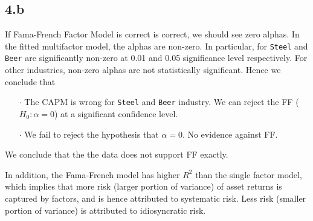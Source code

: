 \documentclass[10 pt]{hwtemplate} %
\begin{document}
\subsection*{4.b} If Fama-French Factor Model is correct is correct, we should see zero alphas. 
In the fitted multifactor model, the alphas are non-zero. In particular, for \texttt{Steel} and \texttt{Beer} are significantly non-zero at 0.01 and 0.05 significance level respectively. For other industries, non-zero alphas are not statistically significant. Hence we conclude that
\begin{itemize}
  \item[$\cdot$] The CAPM is wrong for \texttt{Steel} and \texttt{Beer} industry. We can reject the FF ($H_0: \alpha = 0$) at a significant confidence level.
  \item[$\cdot$] We fail to reject the hypothesis that $\alpha = 0$. No evidence against FF.
\end{itemize}
We conclude that the the data does not support FF exactly.

In addition, the Fama-French model has higher $R^2$ than the single factor model, which implies that more risk (larger portion of variance) of asset returns is captured by factors, and is hence attributed to systematic risk. Less risk (smaller portion of variance) is attributed to idiosyncratic risk.
\end{document}
